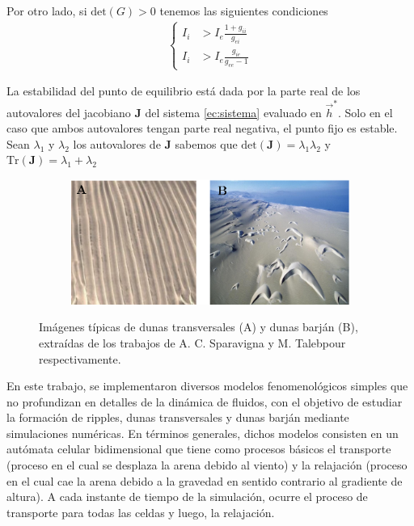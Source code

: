 \documentclass[11pt,twocolumn,twoside]{opticajnl}
\begin{document}
Por otro lado, si $\text{det}(G) > 0$ tenemos las siguientes condiciones
\begin{align}
    \left\{
    \begin{aligned}
        I_i &> I_e \frac{1+g_{ii}}{g_{ei}}\\
        I_i &> I_e \frac{g_{ie}}{g_{ee}-1}
    \end{aligned}
    \right.
\end{align}

La estabilidad del punto de equilibrio está dada por la parte real de los autovalores del jacobiano $\boldsymbol{J}$ del sistema \ref{ec:sistema} evaluado en $\vec{h}^*$. Solo en el caso que ambos autovalores tengan parte real negativa, el punto fijo es estable. Sean $\lambda_1$ y $\lambda_2$ los autovalores de $\boldsymbol{J}$ sabemos que $\text{det}(\boldsymbol{J}) = \lambda_1\lambda_2$ y $\text{Tr}(\boldsymbol{J}) = \lambda_1 + \lambda_2$




\begin{figure}[H]
\centering
     \begin{subfigure}[b]{\linewidth}
        \includegraphics[width=\textwidth]{Figuras/dunas.eps}
         \label{fig:dunas}
     \end{subfigure}
\caption{\centering Imágenes típicas de dunas transversales (A) y dunas barján (B), extraídas de los trabajos de A. C. Sparavigna \cite{sparavigna_peruvian_nodate} y M. Talebpour \cite{mahdad_talebpour_numerical_2016} respectivamente.} 
\label{fig:ej}
\end{figure}

En este trabajo, se implementaron diversos modelos fenomenológicos simples que no profundizan en detalles de la dinámica de fluidos, con el objetivo de estudiar la formación de ripples, dunas transversales y dunas barján mediante simulaciones numéricas. En términos generales, dichos modelos consisten en un autómata celular bidimensional que tiene como procesos básicos el transporte (proceso en el cual se desplaza la arena debido al viento) y la relajación (proceso en el cual cae la arena debido a la gravedad en sentido contrario al gradiente de altura). A cada instante de tiempo de la simulación, ocurre el proceso de transporte para todas las celdas y luego, la relajación. 
\end{document}
